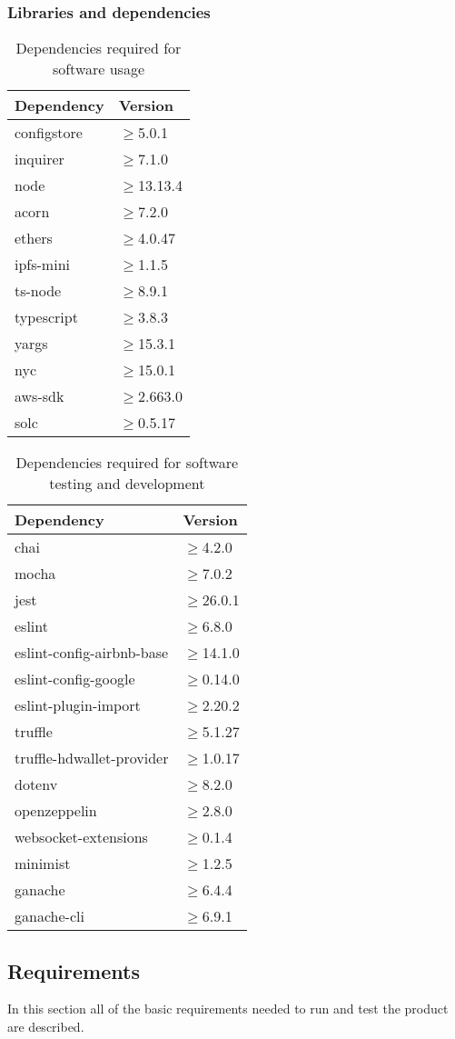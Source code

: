 \subsubsection{Libraries and dependencies}
\begin{longtable}[h!]{
		>{\centering\arraybackslash}p{}
		>{\centering\arraybackslash}p{} }
	\caption{Dependencies required for software usage} \\

	\textbf{\color{white}Dependency} &
	\textbf{\color{white}Version}
	\tabularnewline
	\endhead
	
	configstore & $\geq$5.0.1 \tabularnewline
	inquirer & $\geq$7.1.0 \tabularnewline
	node & $\geq$13.13.4 \tabularnewline
	acorn & $\geq$7.2.0 \tabularnewline
	ethers & $\geq$4.0.47 \tabularnewline
	ipfs-mini & $\geq$1.1.5 \tabularnewline
	ts-node & $\geq$8.9.1 \tabularnewline
	typescript & $\geq$3.8.3 \tabularnewline
	yargs & $\geq$15.3.1 \tabularnewline
	nyc & $\geq$15.0.1 \tabularnewline
	aws-sdk & $\geq$2.663.0 \tabularnewline
	solc & $\geq$0.5.17 \tabularnewline
	
\end{longtable}
\begin{longtable}{
		>{\centering\arraybackslash}p{}
		>{\centering\arraybackslash}p{} }
	\caption{Dependencies required for software testing and development} \\
	
	\textbf{\color{white}Dependency} &
	\textbf{\color{white}Version}
	\tabularnewline
	\endhead
	
	chai & $\geq$4.2.0 \tabularnewline
	mocha & $\geq$7.0.2 \tabularnewline
	jest & $\geq$26.0.1 \tabularnewline
	eslint & $\geq$6.8.0 \tabularnewline
	eslint-config-airbnb-base & $\geq$14.1.0 \tabularnewline
	eslint-config-google & $\geq$0.14.0 \tabularnewline
	eslint-plugin-import & $\geq$2.20.2 \tabularnewline
	truffle & $\geq$5.1.27 \tabularnewline
	truffle-hdwallet-provider & $\geq$1.0.17 \tabularnewline
	dotenv & $\geq$8.2.0 \tabularnewline
	openzeppelin & $\geq$2.8.0 \tabularnewline
	websocket-extensions & $\geq$0.1.4 \tabularnewline
	minimist & $\geq$1.2.5 \tabularnewline
	ganache & $\geq$6.4.4 \tabularnewline
	ganache-cli & $\geq$6.9.1 \tabularnewline
	
\end{longtable}
\subsection{Requirements}
In this section all of the basic requirements needed to run and test the product are described.
